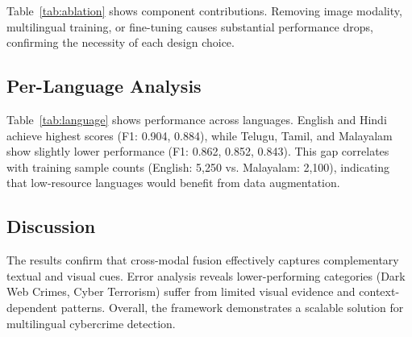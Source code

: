 Table~\ref{tab:ablation} shows component contributions. Removing image modality, multilingual training, or fine-tuning causes substantial performance drops, confirming the necessity of each design choice.

\subsection{Per-Language Analysis}

Table~\ref{tab:language} shows performance across languages. English and Hindi achieve highest scores (F1: 0.904, 0.884), while Telugu, Tamil, and Malayalam show slightly lower performance (F1: 0.862, 0.852, 0.843). This gap correlates with training sample counts (English: 5,250 vs. Malayalam: 2,100), indicating that low-resource languages would benefit from data augmentation.

\subsection{Discussion}

The results confirm that cross-modal fusion effectively captures complementary textual and visual cues. Error analysis reveals lower-performing categories (Dark Web Crimes, Cyber Terrorism) suffer from limited visual evidence and context-dependent patterns. Overall, the framework demonstrates a scalable solution for multilingual cybercrime detection.